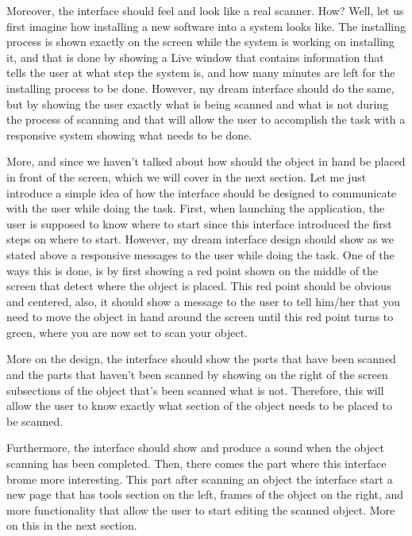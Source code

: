 \documentclass[12pt, oneside]{amsart}   	%
\begin{document}
Moreover, the interface should feel and look like a real scanner.  How?  Well, let us first imagine how installing a new software into a system looks like. The installing process is shown exactly on the screen while the system is working on installing it, and that is done by showing a Live window that contains information that tells the user at what step the system is, and how many minutes are left for the installing process to be done.   However, my dream interface should do the same, but by showing the user exactly what is being scanned and what is not during the process of scanning and that will allow the user to accomplish the task with a responsive system showing what needs to be done.  

More, and since we haven't talked about how should the object in hand be placed in front of the screen, which we will cover in the next section.  Let me just introduce a simple idea of how the interface should be designed to communicate with the user while doing the task.  First, when launching the application, the user is supposed to know where to start since this interface introduced the first steps on where to start.  However, my dream interface design should show as we stated above a responsive messages to the user while doing the task.  One of the ways this is done, is by first showing a red point shown on the middle of the screen that detect where the object is placed. This red point should be obvious and centered, also, it should show a message to the user to tell him/her that you need to move the object in hand around the screen until this red point turns to green, where you are now set to scan your object.  

More on the design, the interface should show the ports that have been scanned and the parts that haven't been scanned by showing on the right of the screen subsections of the object that's been scanned what is not.  Therefore, this will allow the user to know exactly what section of the object needs to be placed to be scanned.

Furthermore, the interface should show and produce a sound when the object scanning has been completed.  Then, there comes the part where this interface brome more interesting.  This part after scanning an object the interface start a new page that has tools section on the left, frames of the object on the right, and more functionality that allow the user to start editing the scanned object. More on this in the next section.
\end{document}
